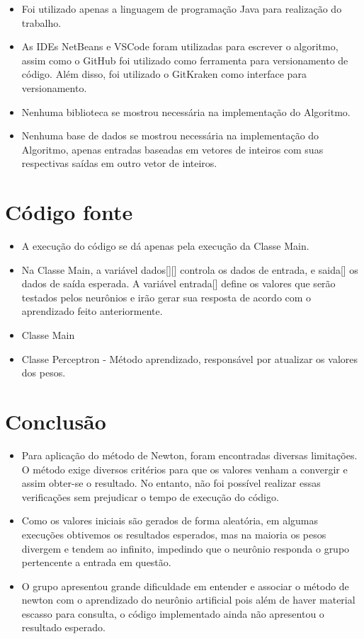 \documentclass[12pt]{article}
\begin{document}
\begin{itemize}
    \item Foi utilizado apenas a linguagem de programação Java para realização do trabalho.
    \item As IDEs NetBeans e VSCode foram utilizadas para escrever o algoritmo, assim como o GitHub foi utilizado como ferramenta para versionamento de código. Além disso, foi utilizado o GitKraken como interface para versionamento.
    \item Nenhuma biblioteca se mostrou necessária na implementação do Algoritmo.
    \item Nenhuma base de dados se mostrou necessária na implementação do Algoritmo, apenas entradas baseadas em vetores de inteiros com suas respectivas saídas em outro vetor de inteiros.
\end{itemize}

\section{Código fonte}
\begin{itemize}
    \item A execução do código se dá apenas pela execução da Classe Main.
    \item Na Classe Main, a variável dados[][] controla os dados de entrada, e saida[] os dados de saída esperada. A variável entrada[] define os valores que serão testados pelos neurônios e irão gerar sua resposta de acordo com o aprendizado feito anteriormente.
    \item Classe Main
\end{itemize}



\begin{itemize}
    \item Classe Perceptron - Método aprendizado, responsável por atualizar os valores dos pesos.
\end{itemize}


\section{Conclusão}

\begin{itemize}
    \item Para aplicação do método de Newton, foram encontradas diversas limitações. O método exige diversos critérios para que os valores venham a convergir e assim obter-se o resultado. No entanto, não foi possível realizar essas verificações sem prejudicar o tempo de execução do código.
    \item Como os valores iniciais são gerados de forma aleatória, em algumas execuções obtivemos os resultados esperados, mas na maioria os pesos divergem e tendem ao infinito, impedindo que o neurônio responda o grupo pertencente a entrada em questão.
    \item O grupo apresentou grande dificuldade em entender e associar o método de newton com o aprendizado do neurônio artificial pois além de haver material escasso para consulta, o código implementado ainda não apresentou o resultado esperado.
\end{itemize}
\end{document}
